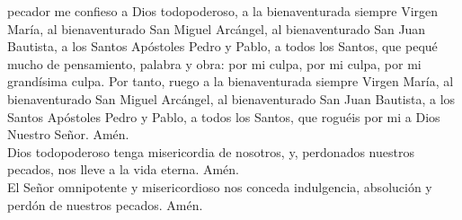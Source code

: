 pecador me confieso a Dios todopoderoso, a la bienaventurada siempre Virgen María, al bienaventurado San Miguel Arcángel,
al bienaventurado San Juan Bautista, a los Santos Apóstoles Pedro y Pablo, a todos los Santos, que pequé mucho
de pensamiento, palabra y obra: por mi culpa, por mi culpa, por mi grandísima culpa. Por tanto, ruego a la bienaventurada
siempre Virgen María, al bienaventurado San Miguel Arcángel, al bienaventurado San Juan Bautista, a los Santos Apóstoles
Pedro y Pablo, a todos los Santos, que roguéis por mi a Dios Nuestro Señor. Amén.\\
Dios todopoderoso tenga misericordia de nosotros, y, perdonados nuestros pecados, nos lleve a la vida eterna. Amén.\\
El Señor omnipotente y misericordioso nos conceda indulgencia, absolución y perdón de nuestros pecados. Amén.